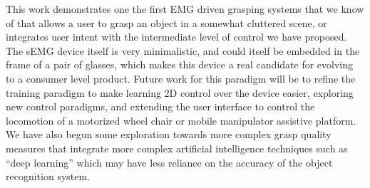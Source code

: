 This work demonstrates one the first EMG driven grasping systems that we know of that allows a user to grasp an object in a somewhat cluttered scene, or integrates user intent with the intermediate level of control we have proposed. The sEMG device itself is very minimalistic, and could itself be embedded in the frame of a pair of glasses, which makes this device a real candidate for evolving to a consumer level product. Future work for this paradigm will be to refine the training paradigm to make learning 2D control over the device easier, exploring new control paradigms, and extending the user interface to control the locomotion of a motorized wheel chair or mobile manipulator assistive platform. We have also begun some exploration towards more complex grasp quality measures that integrate more complex artificial intelligence techniques such as ``deep learning'' which may have less reliance on the accuracy of the object recognition system. 
